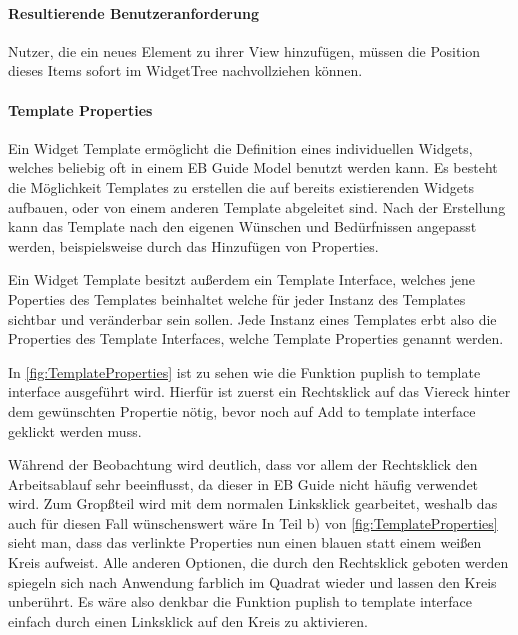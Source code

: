 \paragraph{Resultierende Benutzeranforderung}
Nutzer, die ein neues Element zu ihrer View hinzufügen, müssen die Position dieses Items sofort im WidgetTree nachvollziehen können.

\paragraph{Template Properties}
Ein Widget Template ermöglicht die Definition eines individuellen Widgets, welches beliebig oft in einem EB Guide Model benutzt werden kann.
Es besteht die Möglichkeit Templates zu erstellen die auf bereits existierenden Widgets aufbauen, oder von einem anderen Template abgeleitet sind.
Nach der Erstellung kann das Template nach den eigenen Wünschen und Bedürfnissen angepasst werden, beispielsweise durch das Hinzufügen von Properties.

Ein Widget Template besitzt außerdem ein Template Interface, welches jene Poperties des Templates beinhaltet welche für jeder Instanz des Templates sichtbar und veränderbar sein sollen.
Jede Instanz eines Templates erbt also die Properties des Template Interfaces, welche Template Properties genannt werden.\cite{studio_guide}

In \cref{fig:TemplateProperties} ist zu sehen wie die Funktion puplish to template interface ausgeführt wird.
Hierfür ist zuerst ein Rechtsklick auf das Viereck hinter dem gewünschten Propertie nötig, bevor noch auf Add to template interface geklickt werden muss.

Während der Beobachtung wird deutlich, dass vor allem der Rechtsklick den Arbeitsablauf sehr beeinflusst, da dieser in EB Guide nicht häufig verwendet wird. 
Zum Gropßteil wird mit dem normalen Linksklick gearbeitet, weshalb das auch für diesen Fall wünschenswert wäre
In Teil b) von \cref{fig:TemplateProperties} sieht man, dass das verlinkte Properties nun einen blauen statt einem weißen Kreis aufweist.
Alle anderen Optionen, die durch den Rechtsklick geboten werden spiegeln sich nach Anwendung farblich im Quadrat wieder und lassen den Kreis unberührt.
Es wäre also denkbar die Funktion puplish to template interface einfach durch einen Linksklick auf den Kreis zu aktivieren.

